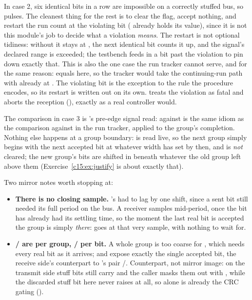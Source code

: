 In case 2, six identical bits in a row are impossible on a correctly stuffed bus, so
 pulses. The cleanest thing for the rest is to clear the flag, accept nothing, and
restart the run count at the violating bit ( already holds its value), since it is not
this module's job to decide what a violation \emph{means}. The restart is not optional tidiness:
without it  stays at , the next identical bit counts it up, and the
signal's declared range is exceeded; the testbench feeds in a bit past the violation to pin down
exactly that. This is also the one case the run tracker cannot serve, and for the same reason:
 equals  here, so the tracker would take the continuing-run path with
 already at . The violating bit is the exception to the rule the
procedure encodes, so its restart is written out on its own.  treats the
violation as fatal and aborts the reception (), exactly as a real controller would.

The comparison in case 3 is 's pre-edge signal read:  against
 is the same idiom as the comparison against  in the run
tracker, applied to the group's completion. Nothing else happens at a group
boundary:  is read live, so the next group simply begins with the next accepted bit at
whatever width  has set by then, and  is \emph{not} cleared; the
new group's bits are shifted in beneath whatever the old group left above them
(Exercise~\ref{c15:ex:justify} is about exactly that).

Two mirror notes worth stopping at:
\begin{itemize}
  \item \textbf{There is no closing sample.} 's  had to lag by one shift,
    since a sent bit still needed its full period on the bus. A receiver samples mid-period, once the
    bit has already had its settling time, so the moment the last real bit is accepted the group is
    simply \emph{there}:  goes at that very sample, with nothing to wait for.
  \item \textbf{/ are per group, / per
    bit.} A whole group is too coarse for , which needs every real bit as it arrives;
     and  expose exactly the single accepted bit, the receive
    side's counterpart to 's pair /. Counterpart, not
    mirror image: on the transmit side stuff bits still carry  and the caller
    masks them out with , while the discarded stuff bit here never raises
     at all, so  alone is already the CRC gating
    ().
\end{itemize}

